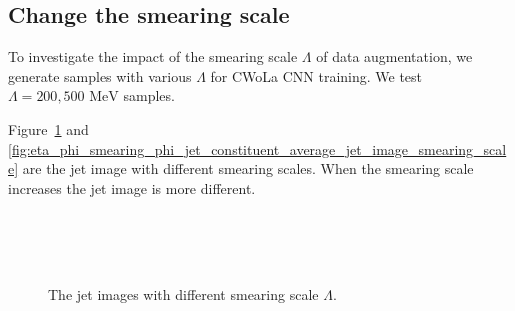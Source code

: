 \documentclass[12pt]{article}
\begin{document}
	\subsection{Change the smearing scale}%
	\label{sub:change_the_smearing_scale}
		To investigate the impact of the smearing scale $\Lambda$ of data augmentation, we generate samples with various $\Lambda$ for CWoLa CNN training. We test $\Lambda = 200, 500 \text{ MeV}$ samples.

		Figure~\ref{fig:eta_phi_smearing_jet_constituent_jet_image_smearing_scale} and \ref{fig:eta_phi_smearing_phi_jet_constituent_average_jet_image_smearing_scale} are the jet image with different smearing scales. When the smearing scale increases the jet image is more different.
		\begin{figure}[htpb]
			\centering
			 \\
			 \\
			 \\
			\caption{The jet images with different smearing scale $\Lambda$.}
			\label{fig:eta_phi_smearing_jet_constituent_jet_image_smearing_scale}
		\end{figure}
\end{document}
